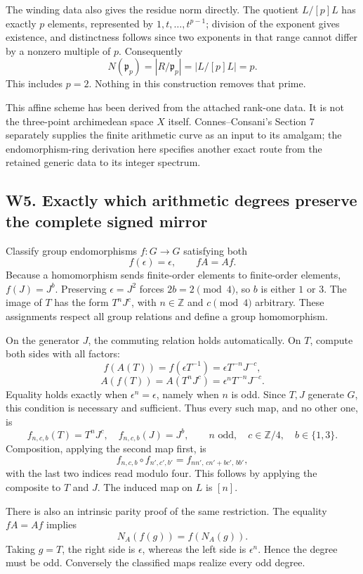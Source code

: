 \documentclass[
  11pt,
]{article}
\begin{document}
The winding data also gives the residue norm directly. The quotient
\(L/[p]L\) has exactly \(p\) elements, represented by
\(1,t,\ldots,t^{p-1}\); division of the exponent gives existence, and
distinctness follows since two exponents in that range cannot differ by
a nonzero multiple of \(p\). Consequently \[
N(\mathfrak p_p)=|R/\mathfrak p_p|=|L/[p]L|=p.
\] This includes \(p=2\). Nothing in this construction removes that
prime.

This affine scheme has been derived from the attached rank-one data. It
is not the three-point archimedean space \(X\) itself. Connes--Consani's
Section 7 separately supplies the finite arithmetic curve as an input to
its amalgam; the endomorphism-ring derivation here specifies another
exact route from the retained generic data to its integer spectrum.

\subsection{W5. Exactly which arithmetic degrees preserve the complete
signed
mirror}\label{w5.-exactly-which-arithmetic-degrees-preserve-the-complete-signed-mirror}

Classify group endomorphisms \(f:G\to G\) satisfying both \[
f(\epsilon)=\epsilon,\qquad fA=Af.
\] Because a homomorphism sends finite-order elements to finite-order
elements, \(f(J)=J^b\). Preserving \(\epsilon=J^2\) forces
\(2b=2\pmod4\), so \(b\) is either \(1\) or \(3\). The image of \(T\)
has the form \(T^nJ^c\), with \(n\in\mathbb Z\) and \(c\pmod4\)
arbitrary. These assignments respect all group relations and define a
group homomorphism.

On the generator \(J\), the commuting relation holds automatically. On
\(T\), compute both sides with all factors: \[
f(A(T))=f(\epsilon T^{-1})=\epsilon T^{-n}J^{-c},
\] \[
A(f(T))=A(T^nJ^c)=\epsilon^nT^{-n}J^{-c}.
\] Equality holds exactly when \(\epsilon^n=\epsilon\), namely when
\(n\) is odd. Since \(T,J\) generate \(G\), this condition is necessary
and sufficient. Thus every such map, and no other one, is \[
f_{n,c,b}(T)=T^nJ^c,\quad f_{n,c,b}(J)=J^b,
\qquad n\text{ odd},\quad c\in\mathbb Z/4,\quad b\in\{1,3\}.
\] Composition, applying the second map first, is \[
f_{n,c,b}\circ f_{n',c',b'}
=f_{nn',\,cn'+bc',\,bb'},
\] with the last two indices read modulo four. This follows by applying
the composite to \(T\) and \(J\). The induced map on \(L\) is \([n]\).

There is also an intrinsic parity proof of the same restriction. The
equality \(fA=Af\) implies \[
N_A(f(g))=f(N_A(g)).
\] Taking \(g=T\), the right side is \(\epsilon\), whereas the left side
is \(\epsilon^n\). Hence the degree must be odd. Conversely the
classified maps realize every odd degree.
\end{document}
